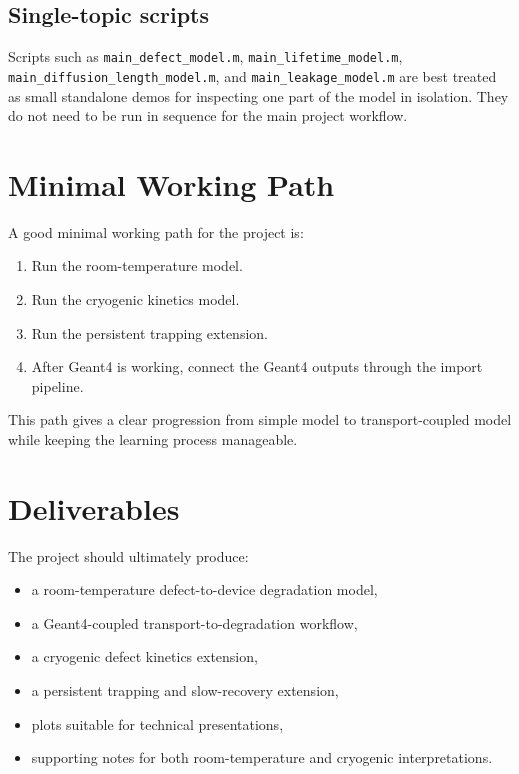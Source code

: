 \documentclass[11pt]{article}
\begin{document}
\subsection*{Single-topic scripts}
Scripts such as \texttt{main\_defect\_model.m}, \texttt{main\_lifetime\_model.m}, \texttt{main\_diffusion\_length\_model.m}, and \texttt{main\_leakage\_model.m} are best treated as small standalone demos for inspecting one part of the model in isolation. They do not need to be run in sequence for the main project workflow.

\section{Minimal Working Path}
A good minimal working path for the project is:
\begin{enumerate}[leftmargin=2em]
    \item Run the room-temperature model.
    \item Run the cryogenic kinetics model.
    \item Run the persistent trapping extension.
    \item After Geant4 is working, connect the Geant4 outputs through the import pipeline.
\end{enumerate}

This path gives a clear progression from simple model to transport-coupled model while keeping the learning process manageable.

\section{Deliverables}
The project should ultimately produce:
\begin{itemize}[leftmargin=2em]
    \item a room-temperature defect-to-device degradation model,
    \item a Geant4-coupled transport-to-degradation workflow,
    \item a cryogenic defect kinetics extension,
    \item a persistent trapping and slow-recovery extension,
    \item plots suitable for technical presentations,
    \item supporting notes for both room-temperature and cryogenic interpretations.
\end{itemize}
\end{document}
